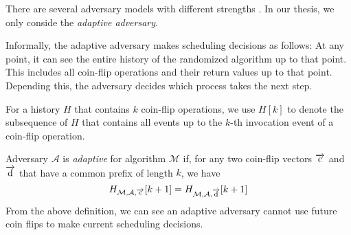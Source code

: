 There are several adversary models with different strengths \cite{DBLP:journals/corr/cs-DS-0209014}.
In our thesis, we only conside the \emph{adaptive adversary}.

Informally, the adaptive adversary makes scheduling
decisions as follows: At any point, it can see the entire history of the randomized algorithm up to that point.
This includes all coin-flip operations and their return values up to that point. Depending this,
the adversary decides which process takes the next step.

For a history $H$ that contains $k$ coin-flip operations, we use $H[k]$ to denote the subsequence of
$H$ that contains all events up to the $k$-th invocation event of a coin-flip operation.

Adversary $\mathcal{A}$ is \emph{adaptive} for algorithm $\mathcal{M}$ if, for any two coin-flip
vectors $\overrightarrow{\rm c}$ and $\overrightarrow{\rm d}$ that have a common prefix
of length $k$, we have
$$H_{\mathcal{M},\mathcal{A}, \overrightarrow{\rm c}}[k+1] = H_{\mathcal{M},\mathcal{A}, \overrightarrow{\rm d}}[k+1]$$
From the above definition, we can see an adaptive adversary cannot use
future coin flips to make current scheduling decisions.
